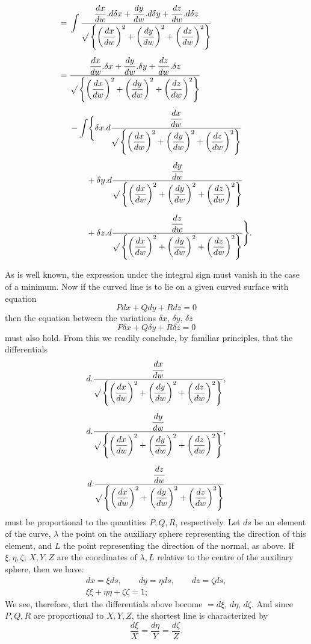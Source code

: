%
\[
\begin{aligned}
={}&\int\frac{\dfrac{dx}{dw}.d\delta x+\dfrac{dy}{dw}.d\delta y+\dfrac{dz}{dw}.d\delta z}{\mathord{\surd}\left\{\left(\dfrac{dx}{dw}\right)^{2}+\left(\dfrac{dy}{dw}\right)^{2}+\left(\dfrac{dz}{dw}\right)^{2}\right\}}\\[5pt]
={}&\frac{\dfrac{dx}{dw}.\delta x+\dfrac{dy}{dw}.\delta y+\dfrac{dz}{dw}.\delta z}{\mathord{\surd}\left\{\left(\dfrac{dx}{dw}\right)^{2}+\left(\dfrac{dy}{dw}\right)^{2}+\left(\dfrac{dz}{dw}\right)^{2}\right\}}\\[5pt]
&-\int\Biggl\{\delta x.d\frac{\dfrac{dx}{dw}}{\mathord{\surd}\left\{\left(\dfrac{dx}{dw}\right)^{2}+\left(\dfrac{dy}{dw}\right)^{2}+\left(\dfrac{dz}{dw}\right)^{2}\right\}}\\[5pt]
&\qquad+\delta y.d\frac{\dfrac{dy}{dw}}{\mathord{\surd}\left\{\left(\dfrac{dx}{dw}\right)^{2}+\left(\dfrac{dy}{dw}\right)^{2}+\left(\dfrac{dz}{dw}\right)^{2}\right\}}\\[5pt]
&\qquad+\delta z.d\frac{\dfrac{dz}{dw}}{\mathord{\surd}\left\{\left(\dfrac{dx}{dw}\right)^{2}+\left(\dfrac{dy}{dw}\right)^{2}+\left(\dfrac{dz}{dw}\right)^{2}\right\}}\Biggr\}.
\end{aligned}
\]

As is well known, the expression under the integral sign must vanish in the case of a minimum. Now if the curved line is to lie on a given curved surface with equation
\[
Pdx+Qdy+Rdz=0
\]
then the equation between the variations $\delta x$, $\delta y$, $\delta z$
\[
P\delta x+Q\delta y+R\delta z=0
\]
must also hold. From this we readily conclude, by familiar principles, that the differentials
\[
\begin{gathered}
d.\frac{\dfrac{dx}{dw}}{\mathord{\surd}\left\{\left(\dfrac{dx}{dw}\right)^{2}+\left(\dfrac{dy}{dw}\right)^{2}+\left(\dfrac{dz}{dw}\right)^{2}\right\}},\\[5pt]
d.\frac{\dfrac{dy}{dw}}{\mathord{\surd}\left\{\left(\dfrac{dx}{dw}\right)^{2}+\left(\dfrac{dy}{dw}\right)^{2}+\left(\dfrac{dz}{dw}\right)^{2}\right\}},\\[5pt]
d.\frac{\dfrac{dz}{dw}}{\mathord{\surd}\left\{\left(\dfrac{dx}{dw}\right)^{2}+\left(\dfrac{dy}{dw}\right)^{2}+\left(\dfrac{dz}{dw}\right)^{2}\right\}}
\end{gathered}
\]
must be proportional to the quantities $P,Q,R$, respectively. Let $ds$ be an element of the curve, $\lambda$ the point on the auxiliary sphere representing the direction of this element, and $L$ the point representing the direction of the normal, as above. If $\xi,\eta,\zeta$; $X,Y,Z$ are the coordinates of $\lambda,L$ relative to the centre of the auxiliary sphere, then we have:
\[
\begin{gathered}
dx=\xi ds,\qquad dy=\eta ds,\qquad dz=\zeta ds,\\
\xi\xi+\eta\eta+\zeta\zeta=1;
\end{gathered}
\]
We see, therefore, that the differentials above become $=d\xi$, $d\eta$, $d\zeta$. And since $P,Q,R$ are proportional to $X,Y,Z$, the shortest line is characterized by
\[
\frac{d\xi}{X}=\frac{d\eta}{Y}=\frac{d\zeta}{Z}.
\]
